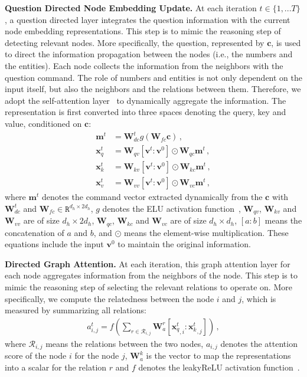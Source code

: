 \documentclass{article}
\begin{document}
{\bf Question Directed Node Embedding Update.}
At each iteration $t \in \{1,...T\}$, a question directed layer integrates the question information with the current node embedding representations. This step is to mimic the reasoning step of detecting relevant nodes. More specifically, the question, represented by $\mathbf{c}$, is used to direct the information propagation between the nodes (i.e., the numbers and the entities).
Each node collects the information from the neighbors with the question command.
The role of numbers and entities is not only dependent on the input itself, but also the neighbors and the relations between them.
Therefore, we adopt the self-attention layer~\cite{vaswani2017attention} to dynamically aggregate the information.
The representation is first converted into three spaces denoting the query, key and value, conditioned on $\mathbf{c}$:
\begin{align}
\mathbf{m}^t &= \mathbf{W}_{dc}^t{g(\mathbf{W}_{fc} \mathbf{c})} \,, \\
\mathbf{x}_q^t &= \mathbf{W}_{qv}[\mathbf{v}^t: \mathbf{v}^0]\odot \mathbf{W}_{qc}\mathbf{m}^t\,, \\
\mathbf{x}_k^t &= \mathbf{W}_{kv}[\mathbf{v}^t: \mathbf{v}^0] \odot \mathbf{W}_{kc}\mathbf{m}^t\,, \\
\mathbf{x}_v^t &= \mathbf{W}_{vv}[\mathbf{v}^t: \mathbf{v}^0] \odot \mathbf{W}_{vc}\mathbf{m}^t\,,
\end{align}
where $\mathbf{m}^t$ denotes the command vector extracted dynamically from the $\mathbf{c}$ with $\mathbf{W}_{dc}^t$ and $\mathbf{W}_{fc} \in \mathtt{R}^{d_h \times 2d_h}$, $g$ denotes the ELU activation function~\cite{DBLP:journals/corr/ClevertUH15},
$\mathbf{W}_{qv}$, $\mathbf{W}_{kv}$ and $\mathbf{W}_{vv}$ are of size $d_h \times 2d_h$, $\mathbf{W}_{qc}$, $\mathbf{W}_{kc}$ and $\mathbf{W}_{vc}$ are of size $d_h \times d_h$, $[a:b]$ means the concatenation of $a$ and $b$, and $\odot$ means the element-wise multiplication.
These equations include the input $\mathbf{v}^0$ to maintain the original information.

{\bf Directed Graph Attention.} At each iteration, this graph attention layer for each node aggregates information from the neighbors of the node. This step is to mimic the reasoning step of selecting the relevant relations to operate on. 
More specifically, we compute the relatedness between the node $i$ and $j$, which is measured by summarizing all relations:
\begin{align}
a^t_{i,j} = f(\sum_{ r\in \mathcal{R}_{i,j}} \mathbf{W}^r_{a} [{\mathbf{x}_q^t}_{,i}: {\mathbf{x}_k^t}_{,j}]) \,,
\end{align}
where $\mathcal{R}_{i,j}$ means the relations between the two nodes, $a_{i,j}$ denotes the attention score of the node $i$ for the node $j$, $\mathbf{W}^k_a$ is the vector to map the representations into a scalar for the relation $r$ and $f$ denotes the leakyReLU activation function~\cite{DBLP:journals/corr/XuWCL15}. 
\end{document}
